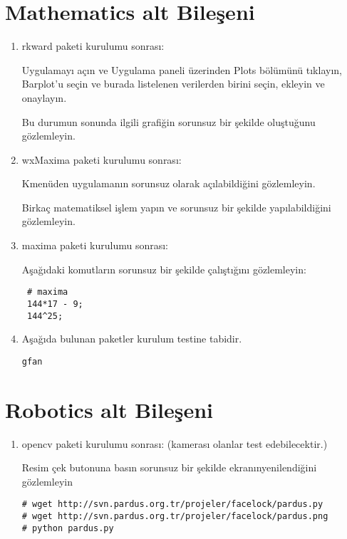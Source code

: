 \documentclass[a4paper,10pt]{article}
\begin{document}
\section{Mathematics alt Bileşeni}
\begin{enumerate}
\item rkward paketi kurulumu sonrası:

Uygulamayı açın ve Uygulama paneli üzerinden Plots bölümünü tıklayın, Barplot'u seçin ve burada listelenen verilerden birini seçin, ekleyin ve onaylayın. 

Bu durumun sonunda ilgili grafiğin sorunsuz bir şekilde oluştuğunu gözlemleyin.

\item wxMaxima paketi kurulumu sonrası:

Kmenüden uygulamanın sorunsuz olarak açılabildiğini gözlemleyin.

Birkaç matematiksel işlem yapın ve sorunsuz bir şekilde yapılabildiğini gözlemleyin.
\item maxima paketi kurulumu sonrası:

Aşağıdaki komutların sorunsuz bir şekilde çalıştığını gözlemleyin:
\begin{verbatim}
 # maxima
 144*17 - 9;
 144^25;
\end{verbatim}

\item Aşağıda bulunan paketler kurulum testine tabidir.
\begin{verbatim}
gfan 
\end{verbatim}

\end{enumerate}

\section{Robotics alt Bileşeni}
\begin{enumerate}
 \item opencv paketi kurulumu sonrası: (kamerası olanlar test edebilecektir.)

Resim çek butonuna basın sorunsuz bir şekilde ekranınyenilendiğini gözlemleyin
\begin{verbatim}
# wget http://svn.pardus.org.tr/projeler/facelock/pardus.py
# wget http://svn.pardus.org.tr/projeler/facelock/pardus.png
# python pardus.py
\end{verbatim}


\end{enumerate}
\end{document}
